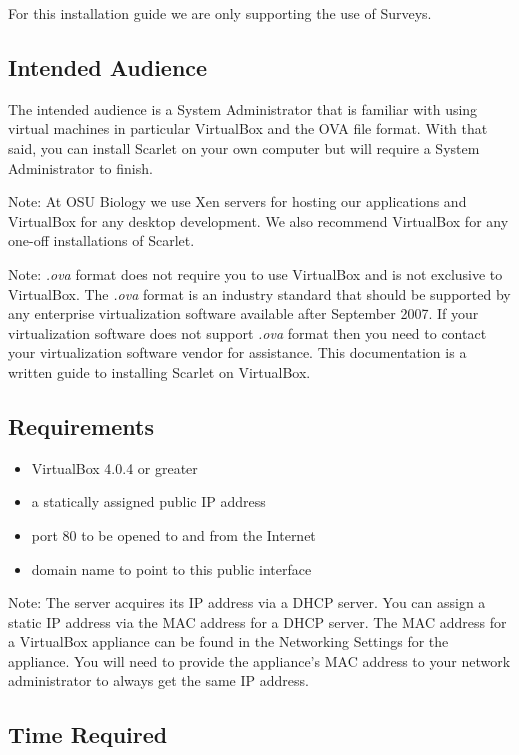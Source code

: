 \documentclass[pdftex,11pt,letterpaper]{article}
\begin{document}
For this installation guide we are only supporting the use of Surveys.

\subsection{Intended Audience}

The intended audience is a System Administrator that is familiar with using virtual machines in particular VirtualBox and the OVA file format.  With that said, you can install Scarlet on your own computer but will require a System Administrator to finish.

Note:
At OSU Biology we use Xen servers for hosting our applications and VirtualBox for any desktop development.  We also recommend VirtualBox for any one-off installations of Scarlet.

Note:
\textit{.ova} format does not require you to use VirtualBox and is not exclusive to VirtualBox.  The \textit{.ova} format is an industry standard that should be supported by any enterprise virtualization software available after September 2007.  If your virtualization software does not support \textit{.ova} format then you need to contact your virtualization software vendor for assistance.  This documentation is a written guide to installing Scarlet on VirtualBox.

\subsection{Requirements}

\begin{itemize}
\item VirtualBox 4.0.4 or greater
\item a statically assigned public IP address 
\item port 80 to be opened to and from the Internet
\item domain name to point to this public interface
\end{itemize}

Note:
The server acquires its IP address via a DHCP server.  You can assign a static IP address via the MAC address for a DHCP server.  The MAC address for a VirtualBox appliance can be found in the Networking Settings for the appliance. You will need to provide the appliance's MAC address to your network administrator to always get the same IP address.

\subsection{Time Required}
\end{document}
